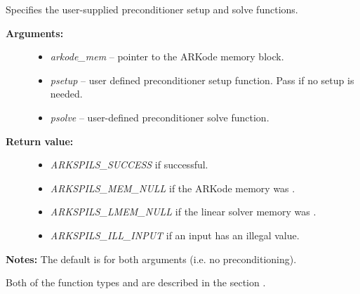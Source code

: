 \documentclass[letterpaper,10pt,english]{sphinxmanual}
\begin{document}
\begin{fulllineitems}
\label{c_interface/User_callable:c.ARKSpilsSetPreconditioner}
Specifies the user-supplied preconditioner setup and solve functions.
\begin{description}
\item[{\textbf{Arguments:}}] \leavevmode\begin{itemize}
\item {} 
\emph{arkode\_mem} -- pointer to the ARKode memory block.

\item {} 
\emph{psetup} -- user defined preconditioner setup function.  Pass
 if no setup is needed.

\item {} 
\emph{psolve} -- user-defined preconditioner solve function.

\end{itemize}

\item[{\textbf{Return value:}}] \leavevmode\begin{itemize}
\item {} 
\emph{ARKSPILS\_SUCCESS} if successful.

\item {} 
\emph{ARKSPILS\_MEM\_NULL} if the ARKode memory was .

\item {} 
\emph{ARKSPILS\_LMEM\_NULL} if the linear solver memory was .

\item {} 
\emph{ARKSPILS\_ILL\_INPUT} if an input has an illegal value.

\end{itemize}

\end{description}

\textbf{Notes:} The default is  for both arguments (i.e. no
preconditioning).

Both of the function types {\hyperref[c_interface/User_supplied:c.ARKSpilsPrecSetupFn]{\emph{}}} and
{\hyperref[c_interface/User_supplied:c.ARKSpilsPrecSolveFn]{\emph{}}} are described in the section
{\hyperref[c_interface/User_supplied:cinterface-usersupplied]{\emph{}}}.

\end{fulllineitems}
\end{document}
